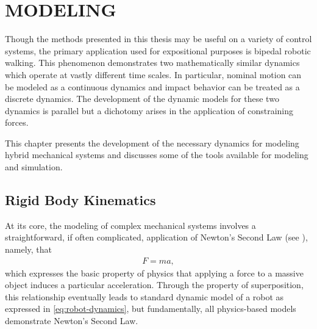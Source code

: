 \chapter{\uppercase{Modeling}}

Though the methods presented in this thesis may be useful on a variety of control systems, the primary application used for expositional purposes is bipedal robotic walking.
%
This phenomenon demonstrates two mathematically similar dynamics which operate at vastly different time scales.
%
In particular, nominal motion can be modeled as a continuous dynamics and impact behavior can be treated as a discrete dynamics.
%
The development of the dynamic models for these two dynamics is parallel but a dichotomy arises in the application of constraining forces.

This chapter presents the development of the necessary dynamics for modeling hybrid mechanical systems and discusses some of the tools available for modeling and simulation.


\section{Rigid Body Kinematics}

At its core, the modeling of complex mechanical systems involves a straightforward, if often complicated, application of Newton's Second Law (see \cite{feynman1963}), namely,
that
\begin{align}
  \label{eq:newtons-second}
  F = m a,
\end{align}
which expresses the basic property of physics that applying a force to a massive object induces a particular acceleration.
%
Through the property of superposition, this relationship eventually leads to standard dynamic model of a robot as expressed in \ref{eq:robot-dynamics}, but fundamentally, all physics-based models demonstrate Newton's Second Law.

